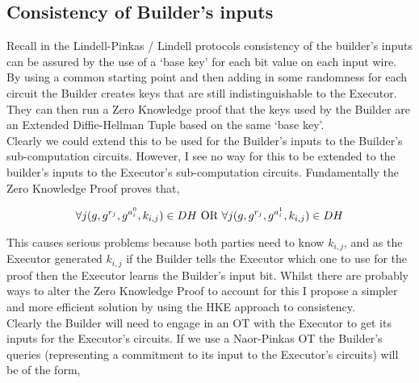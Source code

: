 \documentclass[ %
                    author={Nicholas Tutte},
                supervisor={Prof. Nigel Smart},
                    degree={MEng},
                     title={Secure Two Party Computation},
                  subtitle={A practical comparison of recent protocols},
                      type={Research - GG1K},
                      year={2015} ]{dissertation}
\begin{document}
			\subsection{Consistency of Builder's inputs}
				Recall in the Lindell-Pinkas / Lindell protocols consistency of the builder's inputs can be assured by the use of a `base key' for each bit value on each input wire. By using a common starting point and then adding in some randomness for each circuit the Builder creates keys that are still indistinguishable to the Executor. They can then run a Zero Knowledge proof that the keys used by the Builder are an Extended Diffie-Hellman Tuple based on the same `base key'.\\

				Clearly we could extend this to be used for the Builder's inputs to the Builder's sub-computation circuits. However, I see no way for this to be extended to the builder's inputs to the Executor's sub-computation circuits. Fundamentally the Zero Knowledge Proof proves that,
				
				$$\forall j (g, g^{r_j}, g^{a_i^0}, k_{i,j}) \in DH \textnormal{ OR } \forall j (g, g^{r_j}, g^{a_i^1}, k_{i,j}) \in DH$$
				
				This causes serious problems because both parties need to know $k_{i,j}$, and as the Executor generated $k_{i,j}$ if the Builder tells the Executor which one to use for the proof then the Executor learns the Builder's input bit. Whilst there are probably ways to alter the Zero Knowledge Proof to account for this I propose a simpler and more efficient solution by using the HKE approach to consistency.\\

				Clearly the Builder will need to engage in an OT with the Executor to get its inputs for the Executor's circuits. If we use a Naor-Pinkas OT the Builder's queries (representing a commitment to its input to the Executor's circuits) will be of the form,

% 
% 
% 
\end{document}
